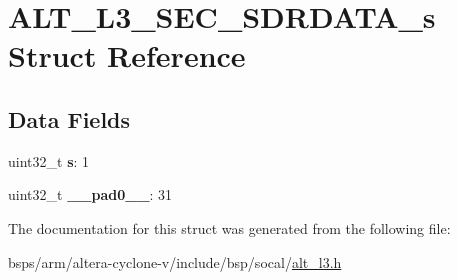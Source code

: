 \hypertarget{structALT__L3__SEC__SDRDATA__s}{}\section{A\+L\+T\+\_\+\+L3\+\_\+\+S\+E\+C\+\_\+\+S\+D\+R\+D\+A\+T\+A\+\_\+s Struct Reference}
\label{structALT__L3__SEC__SDRDATA__s}
\subsection*{Data Fields}
\begin{DoxyCompactItemize}
\item 
\mbox{\label{structALT__L3__SEC__SDRDATA__s_adb328317246d95979b6758a368be839f}} 
uint32\+\_\+t {\bfseries s}\+: 1
\item 
\mbox{\label{structALT__L3__SEC__SDRDATA__s_a2af5284e75c62ee1c47f8fab210946c3}} 
uint32\+\_\+t {\bfseries \+\_\+\+\_\+pad0\+\_\+\+\_\+}\+: 31
\end{DoxyCompactItemize}


The documentation for this struct was generated from the following file\+:\begin{DoxyCompactItemize}
\item 
bsps/arm/altera-\/cyclone-\/v/include/bsp/socal/\mbox{\hyperlink{alt__l3_8h}{alt\+\_\+l3.\+h}}\end{DoxyCompactItemize}

